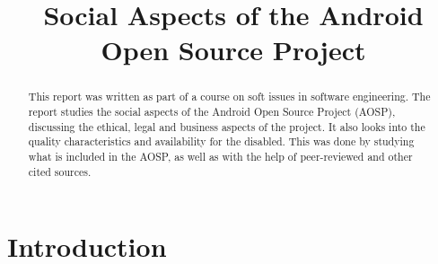 \documentclass[conference]{IEEEtran}
\begin{document}
\title{Social Aspects of the Android Open Source Project}

\author{
{}
}


\maketitle


\begin{abstract}

This report was written as part of a course on soft issues in software engineering. The report studies the social aspects of the Android Open Source Project (AOSP), discussing the ethical, legal and business aspects of the project. It also looks into the quality characteristics and availability for the disabled. This was done by studying what is included in the AOSP, as well as with the help of peer-reviewed and other cited sources. 


\end{abstract}


\section{Introduction}
\label{intro}
\end{document}
